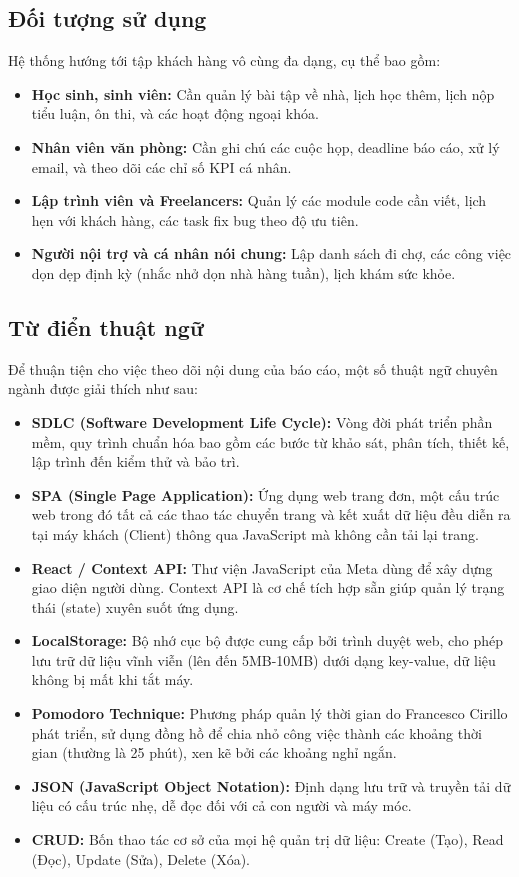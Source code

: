 \subsection{Đối tượng sử dụng}
Hệ thống hướng tới tập khách hàng vô cùng đa dạng, cụ thể bao gồm:
\begin{itemize}
    \item \textbf{Học sinh, sinh viên:} Cần quản lý bài tập về nhà, lịch học thêm, lịch nộp tiểu luận, ôn thi, và các hoạt động ngoại khóa.
    \item \textbf{Nhân viên văn phòng:} Cần ghi chú các cuộc họp, deadline báo cáo, xử lý email, và theo dõi các chỉ số KPI cá nhân.
    \item \textbf{Lập trình viên và Freelancers:} Quản lý các module code cần viết, lịch hẹn với khách hàng, các task fix bug theo độ ưu tiên.
    \item \textbf{Người nội trợ và cá nhân nói chung:} Lập danh sách đi chợ, các công việc dọn dẹp định kỳ (nhắc nhở dọn nhà hàng tuần), lịch khám sức khỏe.
\end{itemize}

\subsection{Từ điển thuật ngữ}
Để thuận tiện cho việc theo dõi nội dung của báo cáo, một số thuật ngữ chuyên ngành được giải thích như sau:
\begin{itemize}
    \item \textbf{SDLC (Software Development Life Cycle):} Vòng đời phát triển phần mềm, quy trình chuẩn hóa bao gồm các bước từ khảo sát, phân tích, thiết kế, lập trình đến kiểm thử và bảo trì.
    \item \textbf{SPA (Single Page Application):} Ứng dụng web trang đơn, một cấu trúc web trong đó tất cả các thao tác chuyển trang và kết xuất dữ liệu đều diễn ra tại máy khách (Client) thông qua JavaScript mà không cần tải lại trang.
    \item \textbf{React / Context API:} Thư viện JavaScript của Meta dùng để xây dựng giao diện người dùng. Context API là cơ chế tích hợp sẵn giúp quản lý trạng thái (state) xuyên suốt ứng dụng.
    \item \textbf{LocalStorage:} Bộ nhớ cục bộ được cung cấp bởi trình duyệt web, cho phép lưu trữ dữ liệu vĩnh viễn (lên đến 5MB-10MB) dưới dạng key-value, dữ liệu không bị mất khi tắt máy.
    \item \textbf{Pomodoro Technique:} Phương pháp quản lý thời gian do Francesco Cirillo phát triển, sử dụng đồng hồ để chia nhỏ công việc thành các khoảng thời gian (thường là 25 phút), xen kẽ bởi các khoảng nghỉ ngắn.
    \item \textbf{JSON (JavaScript Object Notation):} Định dạng lưu trữ và truyền tải dữ liệu có cấu trúc nhẹ, dễ đọc đối với cả con người và máy móc.
    \item \textbf{CRUD:} Bốn thao tác cơ sở của mọi hệ quản trị dữ liệu: Create (Tạo), Read (Đọc), Update (Sửa), Delete (Xóa).
\end{itemize}
